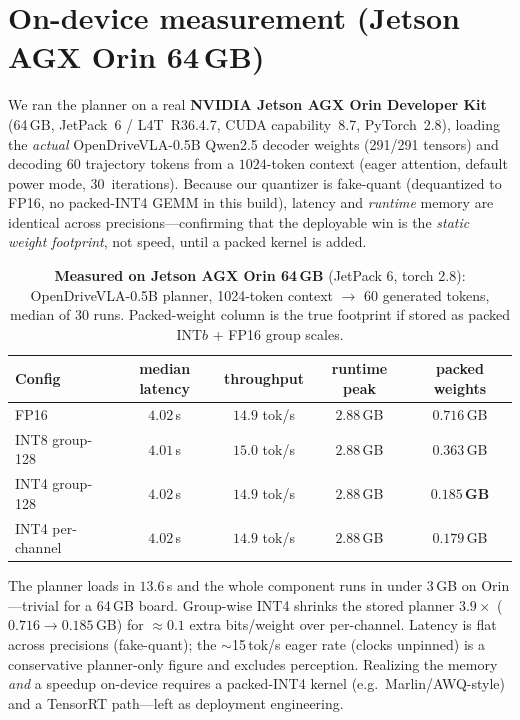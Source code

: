 \documentclass[conference]{IEEEtran}
\begin{document}
\section{On-device measurement (Jetson AGX Orin 64\,GB)}
We ran the planner on a real \textbf{NVIDIA Jetson AGX Orin Developer Kit} (64\,GB, JetPack~6 /
L4T~R36.4.7, CUDA capability~8.7, PyTorch~2.8), loading the \emph{actual} OpenDriveVLA-0.5B
Qwen2.5 decoder weights (291/291 tensors) and decoding $60$ trajectory tokens from a $1024$-token
context (eager attention, default power mode, 30~iterations). Because our quantizer is fake-quant
(dequantized to FP16, no packed-INT4 GEMM in this build), latency and \emph{runtime} memory are
identical across precisions---confirming that the deployable win is the \emph{static weight
footprint}, not speed, until a packed kernel is added.
\begin{table}[t]\centering
\caption{\textbf{Measured on Jetson AGX Orin 64\,GB} (JetPack 6, torch 2.8): OpenDriveVLA-0.5B
planner, 1024-token context $\to$ 60 generated tokens, median of 30 runs. Packed-weight column is
the true footprint if stored as packed INT$b$ + FP16 group scales.}
\begin{tabular}{lcccc}
\toprule
Config & median latency & throughput & runtime peak & packed weights \\
\midrule
FP16             & $4.02$\,s & $14.9$ tok/s & $2.88$\,GB & $0.716$\,GB \\
INT8 group-128   & $4.01$\,s & $15.0$ tok/s & $2.88$\,GB & $0.363$\,GB \\
INT4 group-128   & $4.02$\,s & $14.9$ tok/s & $2.88$\,GB & \textbf{$0.185$\,GB} \\
INT4 per-channel & $4.02$\,s & $14.9$ tok/s & $2.88$\,GB & $0.179$\,GB \\
\bottomrule
\end{tabular}
\end{table}
The planner loads in $13.6$\,s and the whole component runs in under $3$\,GB on Orin---trivial for a
64\,GB board. Group-wise INT4 shrinks the stored planner $3.9\times$ ($0.716\to 0.185$\,GB) for
$\approx 0.1$ extra bits/weight over per-channel. Latency is flat across precisions (fake-quant);
the $\sim$15\,tok/s eager rate (clocks unpinned) is a conservative planner-only figure and excludes
perception. Realizing the memory \emph{and} a speedup on-device requires a packed-INT4 kernel
(e.g.\ Marlin/AWQ-style) and a TensorRT path---left as deployment engineering.
\end{document}
